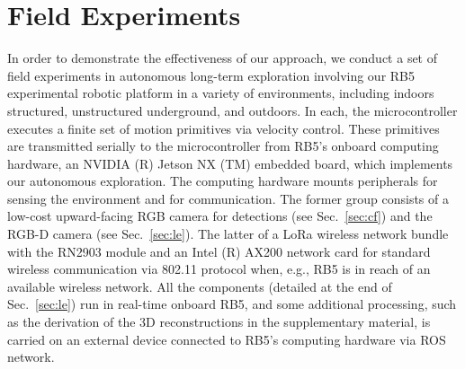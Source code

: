\documentclass[lettersize,journal,twoside]{IEEEtran}
\theoremstyle{definition}
\begin{document}
\section{Field Experiments}
\label{sec:fe}
\noindent
In order to demonstrate the effectiveness of our approach, we conduct a set of 
field experiments in autonomous long-term %
exploration involving our RB5 experimental robotic platform %
in a variety of environments, including indoors structured, unstructured underground, and outdoors. In each, the microcontroller executes a finite set of motion primitives via velocity control. These primitives are transmitted serially to the microcontroller from RB5's onboard computing hardware, an NVIDIA (R) Jetson NX (TM) embedded board, which implements our autonomous %
exploration. %
The computing hardware mounts peripherals for sensing the environment and for communication. The former group consists of a low-cost upward-facing RGB camera for detections (see Sec.~\ref{sec:cf}) and the RGB-D camera (see Sec.~\ref{sec:le}). The latter of a LoRa wireless network bundle with the RN2903 module and an Intel (R) AX200 network card for standard wireless communication via 802.11 protocol when, e.g., RB5 is in reach of an available wireless network.
%
All the components %
(detailed at the end of Sec.~\ref{sec:le}) run in real-time onboard RB5, and some additional processing, such as the derivation of the 3D reconstructions in the supplementary material, is carried on an external device connected to RB5's computing hardware via ROS network.
\end{document}

